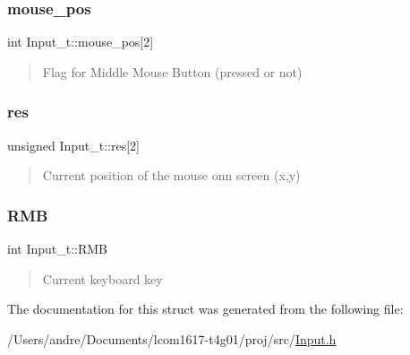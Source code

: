 \hypertarget{struct_input__t_a9af766f0cb90f3abf804a9203387f932}{}\label{struct_input__t_a9af766f0cb90f3abf804a9203387f932} 
\subsubsection{\texorpdfstring{mouse\+\_\+pos}{mouse\_pos}}
{\footnotesize\ttfamily int Input\+\_\+t\+::mouse\+\_\+pos\mbox{[}2\mbox{]}}



\begin{quote}
Flag for Middle Mouse Button (pressed or not) \end{quote}


\hypertarget{struct_input__t_a0a91455b460723c1fc8fccb30a4021f8}{}\label{struct_input__t_a0a91455b460723c1fc8fccb30a4021f8} 
\subsubsection{\texorpdfstring{res}{res}}
{\footnotesize\ttfamily unsigned Input\+\_\+t\+::res\mbox{[}2\mbox{]}}



\begin{quote}
Current position of the mouse onn screen (x,y) \end{quote}


\hypertarget{struct_input__t_ae9b94c465b22787a021d494d2c57b6d4}{}\label{struct_input__t_ae9b94c465b22787a021d494d2c57b6d4} 
\subsubsection{\texorpdfstring{R\+MB}{RMB}}
{\footnotesize\ttfamily int Input\+\_\+t\+::\+R\+MB}



\begin{quote}
Current keyboard key \end{quote}




The documentation for this struct was generated from the following file\+:\begin{DoxyCompactItemize}
\item 
/\+Users/andre/\+Documents/lcom1617-\/t4g01/proj/src/\hyperlink{_input_8h}{Input.\+h}\end{DoxyCompactItemize}
